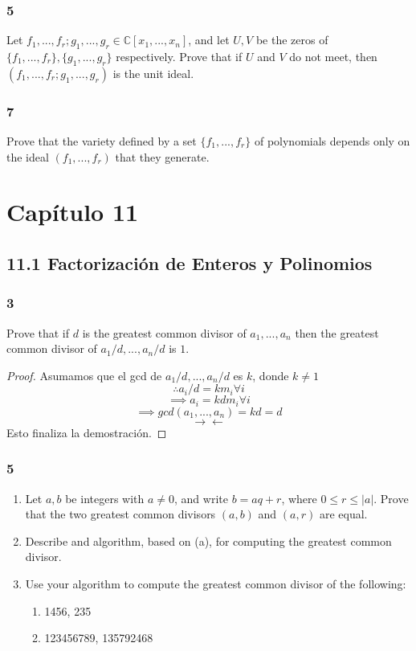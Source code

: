 \documentclass[11pt]{article}
\newcommand{\set}[1]{\mathbb{#1}}
\newcommand{\contr}{\rightarrow\leftarrow}
\theoremstyle{definition}
\begin{document}
        \subsubsection{5}
        Let $f_1,...,f_r;g_1,...,g_r\in\set{C}[x_1,...,x_n]$, and let $U,V$ be the zeros of $\{f_1,...,f_r\},\{g_1,...,g_r\}$ respectively. Prove that if $U$ and $V$ do not meet, then $(f_1,...,f_r;g_1,...,g_r)$ is the unit ideal.

        \subsubsection{7}
        Prove that the variety defined by a set $\{f_1,...,f_r\}$ of polynomials depends only on the ideal $(f_1,...,f_r)$ that they generate.

        \section{Capítulo 11}
        \subsection{11.1 Factorización de Enteros y Polinomios}
        \subsubsection{3}
        Prove that if $d$ is the greatest common divisor of $a_1,...,a_n$ then the greatest common divisor of $a_1/d,...,a_n/d$ is $1$.
        \begin{proof}
            Asumamos que el gcd de $a_1/d,...,a_n/d$ es $k$, donde $k\neq 1$
            \[\therefore a_i/d=km_i\forall i\]
            \[\implies a_i=kdm_i\forall i\]
            \[\implies gcd(a_1,...,a_n)=kd=d\]
            \[\contr\]
            Esto finaliza la demostración.
        \end{proof}

        \subsubsection{5}
        \begin{enumerate}[label=\textbf{(\alph*)}]
            \item Let $a,b$ be integers with $a\neq 0$, and write $b=aq+r$, where $0\leq r\leq |a|$. Prove that the two greatest common divisors $(a,b)$ and $(a,r)$ are equal.

            \item Describe and algorithm, based on (a), for computing the greatest common divisor.

            \item Use your algorithm to compute the greatest common divisor of the following:
            \begin{enumerate}[label=(\alph*)]
                \item 1456, 235

                \item 123456789, 135792468
            \end{enumerate}
        \end{enumerate}
\end{document}
